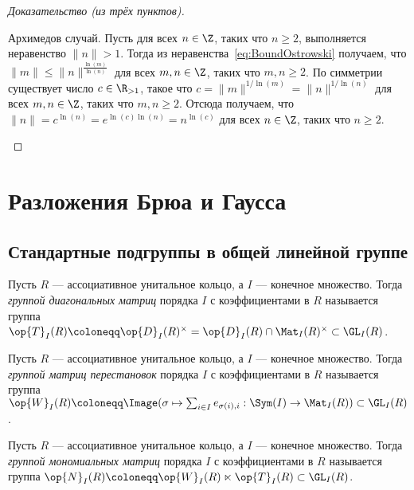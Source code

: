 \documentclass[
	extrafontsizes,
	11pt,
	hyphens,
]{memoir}
\begin{document}
\begin{proof}[Доказательство (из трёх пунктов)]
\begin{proofdescription}
\item[Архимедов случай.]
Пусть для всех \(n \in \Z\), таких что \(n \geq 2\), выполняется неравенство \(\lVert n \rVert > 1\).
Тогда из неравенства~\eqref{eq:BoundOstrowski} получаем, что \(\lVert m \rVert \leq \lVert n \rVert^{\frac{\ln(m)}{\ln(n)}}\) для всех \(m,n \in \Z\), таких что \(m,n \geq 2\).
По симметрии существует число \(c \in \R_{> 1}\), такое что \(c = \lVert m \rVert^{1/\ln(m)} = \lVert n \rVert^{1/\ln(n)}\) для всех \(m,n \in \Z\), таких что \(m,n \geq 2\).
Отсюда получаем, что
\(\lVert n \rVert = c^{\ln(n)} = e^{\ln(c) \ln(n)} = n^{\ln(c)}\)
для всех \(n \in \Z\), таких что \(n \geq 2\).
\qedhere
\end{proofdescription}
\end{proof}


\section{Разложения Брюа и Гаусса}

\subsection{Стандартные подгруппы в общей линейной группе}

\begin{definition}
Пусть \(R\) --- ассоциативное унитальное кольцо, а \(I\) --- конечное множество.
Тогда \emph{группой диагональных матриц} порядка \(I\) с коэффициентами в \(R\) называется группа \(\op{T}_I(R) \coloneqq \op{D}_I(R)^{\times} = \op{D}_I(R) \cap \Mat_I(R)^{\times} \subset \GL_I(R)\).
\end{definition}

\begin{definition}
Пусть \(R\) --- ассоциативное унитальное кольцо, а \(I\) --- конечное множество.
Тогда \emph{группой матриц перестановок}  порядка \(I\) с коэффициентами в \(R\)
называется группа
\(\op{W}_I(R) \coloneqq \Image(\sigma \mapsto \sum_{i \in I} e_{\sigma(i), i} : \Sym(I) \to \Mat_I(R)) \subset \GL_I(R)\).
\end{definition}

\begin{definition}
Пусть \(R\) --- ассоциативное унитальное кольцо, а \(I\) --- конечное множество.
Тогда \emph{группой мономиальных матриц} порядка \(I\) с коэффициентами в \(R\) называется группа \(\op{N}_I(R) \coloneqq \op{W}_I(R) \ltimes \op{T}_I(R) \subset \GL_I(R)\).
\end{definition}
\end{document}
